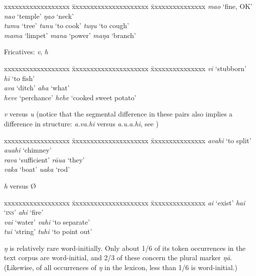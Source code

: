 \ea
\begin{tabbing}
 xxxxxxxxxxxxxxxxxx \= xxxxxxxxxxxxxxxxxxxxx \= xxxxxxxxxxxxxxx \kill
   \textit{mao} ‘fine, OK’ \>  \textit{nao} ‘temple’  \> \textit{ŋao} ‘neck’\\
  \textit{tumu} ‘tree’  \> \textit{tunu} ‘to cook’  \> \textit{tuŋu} ‘to cough’\\
 \textit{mama} ‘limpet’  \> \textit{mana} ‘power’ \>  \textit{maŋa} ‘branch’
\end{tabbing}
\z 
Fricatives: \textit{v}, \textit{h}

\ea
\begin{tabbing}
 xxxxxxxxxxxxxxxxxx \= xxxxxxxxxxxxxxxxxxxxx \= xxxxxxxxxxxxxxx \kill
  \textit{vī} ‘stubborn’  \> \textit{hī} ‘to fish’\\
  \textit{ava} ‘ditch’  \> \textit{aha} ‘what’\\
 \textit{heve} ‘perchance’ \>  \textit{hehe} ‘cooked sweet potato’
\end{tabbing}
\z 

\newpage 
\textit{v} versus \textit{u} (notice that the segmental difference in these pairs also implies a difference in  structure: \textit{{\ꞌ}a.va.hi} versus \textit{{\ꞌ}a.u.a.hi}, see )

\ea
\begin{tabbing}
 xxxxxxxxxxxxxxxxxx \= xxxxxxxxxxxxxxxxxxxxx \= xxxxxxxxxxxxxxx \kill
 \textit{{\ꞌ}avahi} ‘to split’  \> \textit{{\ꞌ}auahi} ‘chimney’\\
 \textit{rava} ‘sufficient’ \>  \textit{rāua} ‘they’\\
 \textit{vaka} ‘boat’ \>  \textit{{\ꞌ}uaka} ‘rod’
\end{tabbing}
\z 
{}\textit{h} versus Ø

\ea
\begin{tabbing}
 xxxxxxxxxxxxxxxxxx \= xxxxxxxxxxxxxxxxxxxxx \= xxxxxxxxxxxxxxx \kill
\textit{ai} ‘exist’  \>\textit{hai} ‘\textsc{ins}’ \> \textit{ahi} ‘fire’\\
 \textit{vai} ‘water’  \>\textit{vahi}  ‘to separate’\\
 \textit{tui} ‘string’  \>\textit{tuhi}  ‘to point out’
\end{tabbing}
\z 
\textit{ŋ} is relatively rare word-initially. Only about 1/6 of its token occurrences in the text corpus are word-initial, and 2/3 of these concern the plural marker \textit{ŋā}. (Likewise, of all occurrences of \textit{ŋ} in the lexicon, less than 1/6 is word-initial.)


